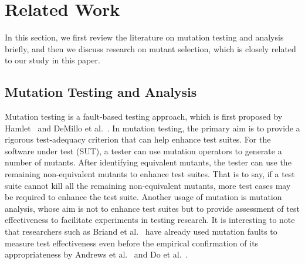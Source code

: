 \vspace{-1ex}
\section{Related Work}
\label{RelatedWork}

In this section, we first review the literature on mutation
testing and analysis briefly, and then we discuss research on
mutant selection, which is closely related to our study in this
paper.

\vspace{-1ex}
\subsection{Mutation Testing and Analysis}
\label{RelatedMutation}

Mutation testing is a fault-based testing approach, which is first
proposed by Hamlet~\cite{Hamlet:77} and DeMillo et
al.~\cite{DeMillo:78}. In mutation testing, the primary aim is to
provide a rigorous test-adequacy criterion that can help enhance
test suites. For the software under test (SUT), a tester can use
mutation operators to generate a number of mutants. After
identifying equivalent mutants, the tester can use the remaining
non-equivalent mutants to enhance test suites. That is to say, if
a test suite cannot kill all the remaining non-equivalent mutants,
more test cases may be required to enhance the test suite. Another
usage of mutation is mutation analysis, whose aim is not to
enhance test suites but to provide assessment of test
effectiveness to facilitate experiments in testing research. It is
interesting to note that researchers such as Briand et
al.~\cite{Briand:04} have already used mutation faults to measure
test effectiveness even before the empirical confirmation of its
appropriateness by Andrews et al.~\cite{Andrews:05} and Do et
al.~\cite{Do:06}.

